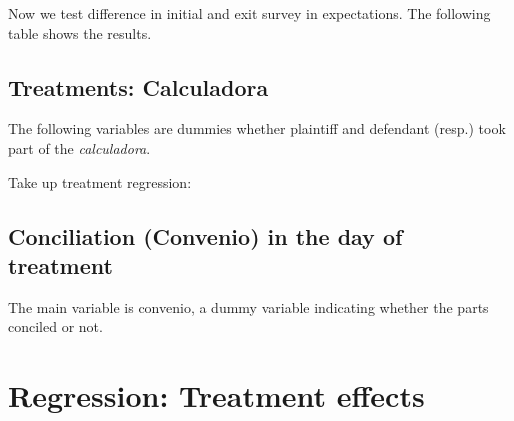 \documentclass[12pt]{article}
\theoremstyle{named}
\newcommand{\folder}{./Effect}
\begin{document}
\pagebreak

Now we test difference in initial and exit survey in expectations. The following table shows the results.

\begin{center}
\scriptsize{}
\end{center}


\pagebreak

\subsection*{Treatments: Calculadora}

The following variables are dummies whether plaintiff and defendant (resp.) took part of the \emph{calculadora}.\\

\begin{center}
\scriptsize{}
\end{center}

\pagebreak

Take up treatment regression:

\begin{center}
\scriptsize{}
\end{center}

\pagebreak



\subsection*{Conciliation (Convenio) in the day of treatment}

The main variable is convenio, a dummy variable indicating whether the parts conciled or not.\\

\begin{center}
\scriptsize{}
\end{center}

\begin{center}
\scriptsize{}
\end{center}


\vspace{5mm}


\pagebreak


\vspace{5mm}

\section{\Huge{Regression: Treatment effects}}
\end{document}
